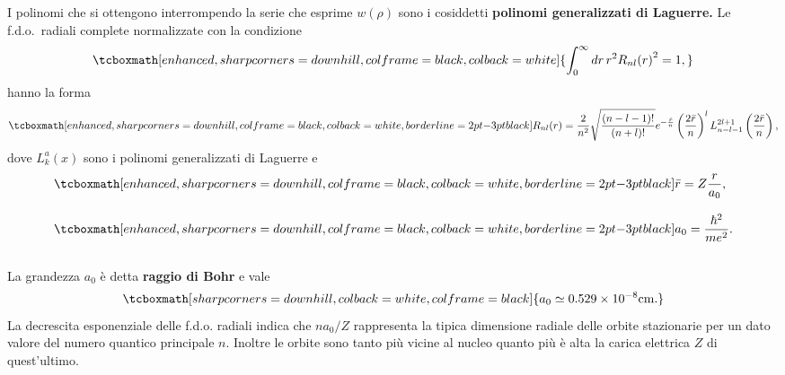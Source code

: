 \documentclass[a4paper,12pt,oneside]{book}
\begin{document}
I polinomi che si ottengono interrompendo la serie che esprime $w(\rho)$ sono i cosiddetti \textbf{polinomi generalizzati di Laguerre.} Le f.d.o.~radiali complete normalizzate con la condizione
	\begin{equation}
		\tcboxmath[enhanced, sharp corners=downhill, colframe=black, colback=white]{
			\int _0 ^{\infty} dr\, r^2 {R_{nl} (r)}^2=1,
			}
	\end{equation}
hanno la forma
	\begin{equation}
		\tcboxmath[enhanced, sharp corners=downhill, colframe=black, colback=white, borderline={2pt}{-3pt}{black}]{
			R_{nl}(r) =\frac{2}{n^2}\sqrt{\frac{\left(n-l-1\right) !}{\left(n+l\right) !}} e^{-\frac{\bar{r}}{n}}\left(\frac{2\bar{r}}{n}\right) ^l L_{n-l-1} ^{2l+1} \left(\frac{2\bar{r}}{n}\right) ,
			}
	\end{equation}
dove $L_k ^a (x)$ sono i polinomi generalizzati di Laguerre e
	\begin{align}
		&\tcboxmath[enhanced, sharp corners=downhill, colframe=black, colback=white, borderline={2pt}{-3pt}{black}]{
			\bar{r}= Z\frac{r}{a_0},
			} \\[0.3cm]
		&\tcboxmath[enhanced, sharp corners=downhill, colframe=black, colback=white, borderline={2pt}{-3pt}{black}]{
			a_0= \frac{\hbar ^2}{me^2}.
			}
	\end{align}\\
	
La grandezza $a_0$ è detta \textbf{raggio di Bohr} e vale
	\begin{equation}
		\tcboxmath[sharp corners=downhill, colback=white, colframe=black]{
			a_0 \simeq 0.529 \times 10^{-8} \textrm{cm}.
			}
	\end{equation}
La decrescita esponenziale delle f.d.o. radiali indica che $n a_0/Z$ rappresenta la tipica dimensione radiale delle orbite stazionarie per un dato valore del numero quantico principale $n$. Inoltre le orbite sono tanto più vicine al nucleo quanto più è alta la carica elettrica $Z$ di quest'ultimo.\\
\end{document}
